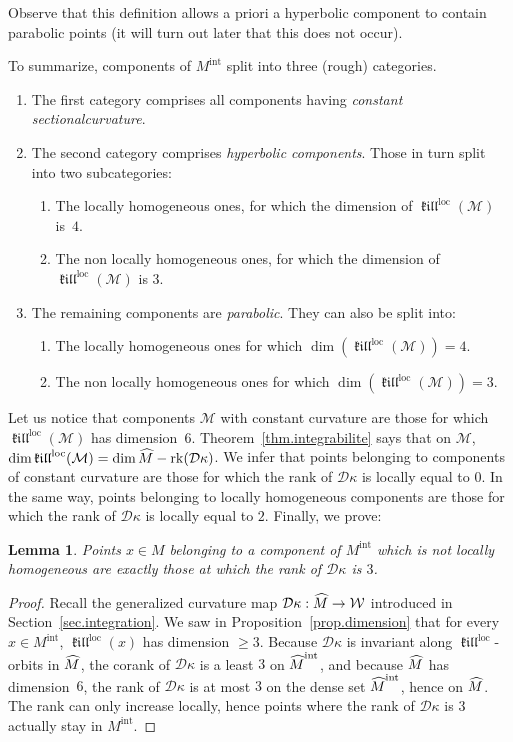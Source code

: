 \documentclass[11pt]{article}
\newtheorem{lemm}[theo]{Lemma}
\theoremstyle{definition}
\numberwithin{equation}{section}
\numberwithin{figure}{section}
\numberwithin{table}{section}
\DeclareMathOperator{\rk}{rk}
\DeclareMathOperator{\loc}{loc}
\newcommand{\mint}{{M^{\intl}}}
\newcommand{\hmint}{{{\hat M}^{\intl}}}
\DeclareMathOperator{\intl}{int}
\DeclareMathOperator{\kil}{{\mathfrak{kill}}}
\newcommand{\kiloc}{\kil^{\loc}}
\newcommand{\calm}{\mathcal{M}}
\newcommand*\dk{{\mathcal{D}\kappa}}
\newcommand{\hm}{{\hat{M}}}
\let\oldhat\hat
\renewcommand*\hat[1]{\mathchoice{\widehat{#1}}{\widehat{#1}}{\widehat{#1}}{\oldhat{#1}}}
\newcommand*{\alphenumi}{\renewcommand*{\theenumi}{\alph{enumi}}}
\begin{document}
Observe that this definition allows a priori a hyperbolic component to contain parabolic points (it will turn out later that this does not occur).

To summarize, components of $\mint$ split into three (rough) categories.
\begin{enumerate}
\item \label{list3.7.1}The first category comprises all components having \emph{constant sectional\linebreak curvature}. 
\item \label{list3.7.2}The second category comprises \emph{hyperbolic components}. Those in turn split into two subcategories:
\begin{enumerate}\alphenumi
\item \label{list3.7.2a}The locally homogeneous ones, for which the dimension of $\kiloc({\mathcal M})$ is~$4$.
\item \label{list3.7.2b}The non locally homogeneous ones, for which the dimension of $\kiloc({\mathcal M})$ is $3$.
\end{enumerate}
\item \label{list3.7.3}The remaining components are \emph{parabolic}. They can also be split into:
\begin{enumerate}\alphenumi
\item \label{list3.7.3a}The locally homogeneous ones for which $\dim(\kiloc({\mathcal M}))=4$.
\item \label{list3.7.3b}The non locally homogeneous ones for which $\dim(\kiloc({\mathcal M}))=3$.
\end{enumerate}
\end{enumerate}

Let us notice that components $\calm$ with constant curvature are those for which $\kiloc(\calm)$ has dimension~$6$. Theorem~\ref{thm.integrabilite} says that on $\calm$, $\dim \kiloc(\calm)=\dim \hm - \rk(\dk)$. We infer that points belonging to components of constant curvature are those for which the rank of $\dk$ is locally equal to $0$. In the same way, points belonging to locally homogeneous components are those for which the rank of $\dk$ is locally equal to $2$. Finally, we prove:

\begin{lemm}\label{lem.rank3}
Points $x \in M$ belonging to a component of $\mint$ which is not locally homogeneous are exactly those at which the rank of $\dk$ is $3$.
\end{lemm}


\begin{proof}
Recall the generalized curvature map $\dk : \hm \to {\mathcal W}$ introduced in Section~\ref{sec.integration}. We saw in Proposition~\ref{prop.dimension} that for every $x \in \mint$, $\kiloc(x)$ has dimension $\geq 3$. Because $\dk$ is invariant along $\kiloc$-orbits in $\hm$, the corank of $\dk$ is a least $3$ on $\hmint$, and because $\hm$ has dimension~$6$, the rank of $\dk$ is at most $3$ on the dense set $\hmint$, hence on $\hm$. The rank can only increase locally, hence points where the rank of $\dk$ is $3$ actually stay in $\mint$.
\end{proof}
\end{document}
